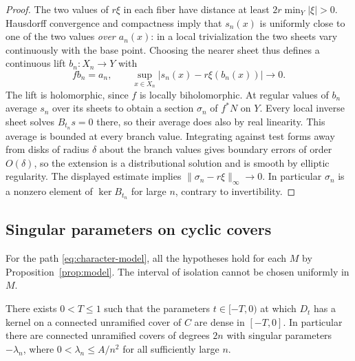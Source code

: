 \begin{proof}
The two values of $r\xi$ in each fiber have distance at least
$2r\min_Y|\xi|>0$. Hausdorff convergence and compactness imply
that $s_n(x)$ is uniformly close to one of the two values
\emph{over $a_n(x)$}: in a local trivialization the two sheets vary
continuously with the base point. Choosing the nearer sheet thus
defines a continuous lift $b_n:X_n\to Y$ with
\[
    f b_n=a_n,\qquad
    \sup_{x\in X_n}|s_n(x)-r\xi(b_n(x))|\longrightarrow0 .
\]
The lift is holomorphic, since $f$ is locally biholomorphic.
At regular values of $b_n$ average $s_n$ over its sheets to obtain
a section $\sigma_n$ of $f^*N$ on $Y$. Every local inverse sheet
solves $B_{t_n}s=0$ there, so their average does also by real
linearity. This average is bounded at every branch value. Integrating
against test forms away from disks of radius $\delta$ about the branch
values gives boundary errors of order $O(\delta)$, so the extension
is a distributional solution and is smooth by elliptic regularity.
The displayed estimate implies
$\|\sigma_n-r\xi\|_\infty\to0$. In particular $\sigma_n$ is a
nonzero element of $\ker B_{t_n}$ for large $n$, contrary to
invertibility.
\end{proof}

\subsection{Singular parameters on cyclic covers}
For the path \eqref{eq:character-model}, all the hypotheses hold for
each $M$ by Proposition~\ref{prop:model}. The interval of isolation
cannot be chosen uniformly in $M$.

\begin{proposition}\label{prop:spectrum}
There exists $0<T\le1$ such that the parameters $t\in[-T,0)$ at
which $D_t$ has a kernel on a connected unramified cover of $C$ are
dense in $[-T,0]$. In particular there are connected unramified
covers of degrees $2n$ with singular parameters $-\lambda_n$, where
$0<\lambda_n\le A/n^2$ for all sufficiently large $n$.
\end{proposition}

